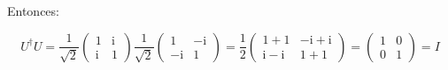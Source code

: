\documentclass[11pt]{article}
\newcommand{\ii}{\mathrm{i}}
\begin{document}
Entonces:

\begin{equation}
    U^\dagger U = \frac{1}{\sqrt{2}} \begin{pmatrix} 1 & \ii \\ \ii & 1 \end{pmatrix} \frac{1}{\sqrt{2}} \begin{pmatrix} 1 & -\ii \\ -\ii & 1 \end{pmatrix} = \frac{1}{2} \begin{pmatrix} 1 + 1 & -\ii + \ii \\ \ii - \ii & 1 + 1 \end{pmatrix} = \begin{pmatrix} 1 & 0 \\ 0 & 1 \end{pmatrix} = I
\end{equation}
\end{document}
